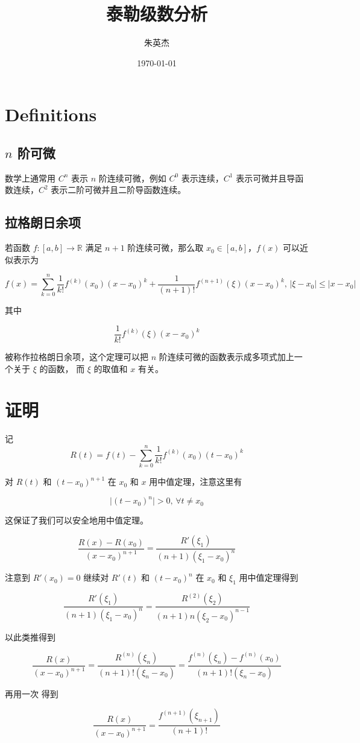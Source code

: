 \documentclass[12pt,a4paper]{ctexart}
\title{泰勒级数分析}
\author{朱英杰}
\date{\today}
\begin{document}

\maketitle

\section{Definitions}

\subsection{$n$ 阶可微}

数学上通常用 $C^n$ 表示 $n$ 阶连续可微，例如 $C^0$ 表示连续，$C^1$ 表示可微并且导函数连续，$C^2$ 表示二阶可微并且二阶导函数连续。

\subsection{拉格朗日余项}

若函数 $f: [a,b] \to \mathbb{R}$ 满足 $n+1$ 阶连续可微，那么取 $x_0 \in [a,b]$，$f(x)$ 可以近似表示为

\[
f(x) = \sum_{k=0}^{n}\frac{1}{k!}f^{(k)}(x_0)(x-x_0)^k + \frac{1}{(n+1)!}f^{(n+1)}(\xi)(x-x_0)^{k},\, \lvert \xi - x_0 \rvert \le \lvert x - x_0 \rvert
\]

其中

\[
\frac{1}{k!}f^{(k)}(\xi)(x-x_0)^{k}
\]

被称作拉格朗日余项，这个定理可以把 $n$ 阶连续可微的函数表示成多项式加上一个关于 $\xi$ 的函数，
而 $\xi$ 的取值和 $x$ 有关。

\section{证明}

记 
\[
R(t) = f(t) - \sum_{k=0}^{n}\frac{1}{k!}f^{(k)}(x_0)(t-x_0)^k
\]

对 $R(t)$ 和 $(t-x_0)^{n+1}$ 在 $x_0$ 和 $x$ 用中值定理，注意这里有

\[
\lvert(t-x_0)^n \rvert > 0,\, \forall t \ne x_0
\]

这保证了我们可以安全地用中值定理。

\[
\frac{R(x)-R(x_0)}{(x-x_0)^{n+1}} = \frac{R'(\xi_1)}{(n+1)(\xi_1-x_0)^n}
\]

注意到 $R'(x_0) = 0$
继续对 $R'(t)$ 和 $(t-x_0)^{n}$ 在 $x_0$ 和 $\xi_1$ 用中值定理得到

\[
\frac{R'(\xi_1)}{(n+1)(\xi_1-x_0)^n} = \frac{R^{(2)}(\xi_2)}{(n+1)n(\xi_2-x_0)^{n-1}}
\]

以此类推得到

\[
\frac{R(x)}{(x-x_0)^{n+1}} = \frac{R^{(n)}(\xi_n)}{(n+1)!(\xi_n - x_0)} =\frac{f^{(n)}(\xi_n)- f^{(n)}(x_0)}{(n+1)!(\xi_n - x_0)}
\]

再用一次
得到


\[
\frac{R(x)}{(x-x_0)^{n+1}}  =\frac{f^{(n+1)}(\xi_{n+1})}{(n+1)!}
\]
\end{document}
